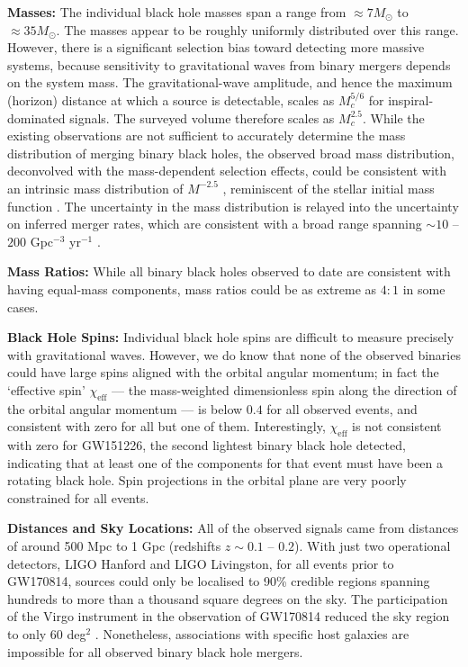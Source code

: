 \documentclass[iop,onecolumn]{revtex4}
\begin{document}
\textbf{Masses:} The individual black hole masses span a range from $\approx 7 M_\odot$ to $\approx 35 M_\odot$.  The masses appear to be roughly uniformly distributed over this range.  However, there is a significant selection bias  toward detecting more massive systems, because sensitivity to gravitational waves from binary mergers depends on the system mass.  The gravitational-wave amplitude, and hence the maximum (horizon) distance at which a source is detectable, scales as $M_c^{5/6}$ for inspiral-dominated signals. The surveyed volume therefore scales as $M_c^{2.5}$.  While the existing observations are not sufficient to accurately determine the mass distribution of merging binary black holes, the observed broad mass distribution, deconvolved with the mass-dependent selection effects, could be consistent with an intrinsic mass distribution of $M^{-2.5}$ \citep{BBH:O1,GW170104}, reminiscent of the stellar initial mass function \citep{Salpeter:1955}.  The uncertainty in the mass distribution is relayed into the uncertainty on inferred merger rates, which are consistent with a broad range spanning $\sim 10$ -- $200$ Gpc$^{-3}$ yr$^{-1}$ \citep{GW170104}.  

\textbf{Mass Ratios:} While all binary black holes observed to date are consistent with having equal-mass components, mass ratios could be as extreme as $4:1$ in some cases.  

\textbf{Black Hole Spins:} Individual black hole spins are difficult to measure precisely with gravitational waves.  However, we do know that none of the observed binaries could have large spins aligned with the orbital angular momentum; in fact the `effective spin' $\chi_\textrm{eff}$ --- the mass-weighted dimensionless spin along the direction of the orbital angular momentum --- is below $0.4$ for all observed events, and consistent with zero for all but one of them.  Interestingly, $\chi_\textrm{eff}$ is not consistent with zero for GW151226, the second lightest binary black hole detected, indicating that at least one of the components for that event must have been a rotating black hole.  Spin projections in the orbital plane are very poorly constrained for all events.

\textbf{Distances and Sky Locations:} All of the observed signals came from distances of around 500 Mpc to 1 Gpc (redshifts $z\sim 0.1$ -- $0.2$).  With just two operational detectors, LIGO Hanford and LIGO Livingston, for all events prior to GW170814, sources could only be localised to 90\% credible regions spanning hundreds to more than a thousand square degrees on the sky.  The participation of the Virgo instrument in the observation of GW170814 reduced the sky region to only 60 deg$^2$ \citep{GW170814}.  Nonetheless, associations with specific host galaxies are impossible for all observed binary black hole mergers.  
\end{document}
